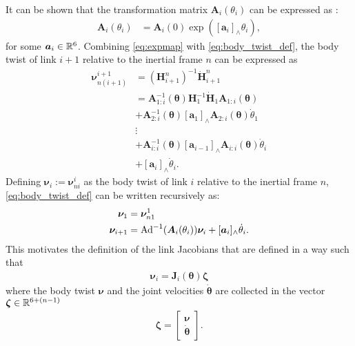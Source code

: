 It can be shown that the transformation matrix $\bm{A}_{i}(\theta_i)$ can be
expressed as \cite{murray2017}:
\begin{align}
    \bm{A}_i(\theta_i) &= \bm{A}_i(0) \exp([\bm{a}_i]_{\wedge} \theta_i), \label{eq:expmap}
\end{align}
for some $\bm{a}_i \in \mathbb{R}^6$. Combining \autoref{eq:expmap} with \autoref{eq:body_twist_def}, the body twist
of link $i+1$ relative to the inertial frame $n$ can be expressed as
\begin{subequations}
\begin{align}
    \bm{\nu}_{n(i+1)}^{i+1} &= \left(\bm{H}_{i+1}^n\right)^{-1} \dot{\bm{H}}_{i+1}^n \\
    &= \bm{A}_{1:i}^{-1}(\bm\theta) \bm{H}_1^{-1} \dot{\bm{H}}_{1} \bm{A}_{1:i}(\bm\theta) \nonumber \\
    &+ \bm{A}_{2:i}^{-1}(\bm\theta) [\bm{a}_1]_{\wedge}\bm{A}_{2:i}(\bm\theta) \dot{\theta}_1 \nonumber \\
    &\vdots \label{eq:body_twist_def} \\
    &+ \bm{A}_{i:i}^{-1}(\bm\theta) [\bm{a}_{i-1}]_{\wedge}\bm{A}_{i:i}(\bm\theta) \dot{\theta}_{i} \nonumber \\
    &+ [\bm{a}_{i}]_{\wedge} \dot{\theta}_i. \nonumber
\end{align}
\end{subequations}
Defining $\bm{\nu}_i := \bm{\nu}_{ni}^i$ as the body twist of link $i$ relative to
the inertial frame $n$, \autoref{eq:body_twist_def} can be written recursively as:
\begin{subequations}
    \label{eq:body_twist_recursive}
\begin{align}
    \bm{\nu}_{1} &= \bm{\nu}_{n1}^1 \\
    \bm{\nu}_{i+1} &= \operatorname{Ad}^{-1}(\bm{A}_i(\theta_i)) \bm{\nu}_i + [\bm{a}_i]_{\wedge} \dot{\theta}_i.
\end{align}
\end{subequations}
This motivates the definition of the link Jacobians that are defined in a way
such that
\begin{align}
    \bm{\nu}_{i} = \bm{J}_i(\bm{\theta}) \bm{\zeta}
\end{align}
where the body twist $\bm{\nu}$ and the joint velocities $\dot{\bm{\theta}}$ are
collected in the vector $\bm{\zeta} \in \mathbb{R}^{6+(n-1)}$
\begin{align}
    \bm{\zeta} = \begin{bmatrix}\bm{\nu} \\ \dot{\bm{\theta}}\end{bmatrix}.
\end{align}
